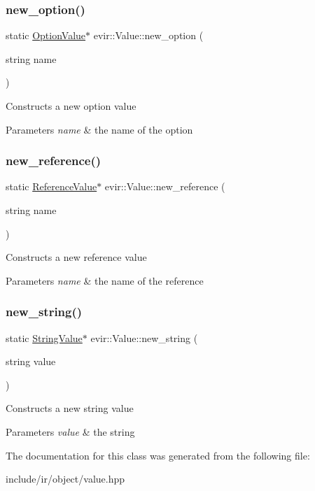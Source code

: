 \subsubsection{\texorpdfstring{new\+\_\+option()}{new\_option()}}
{\footnotesize\ttfamily static \hyperlink{classevir_1_1OptionValue}{Option\+Value}$\ast$ evir\+::\+Value\+::new\+\_\+option (\begin{DoxyParamCaption}\item[{string}]{name }\end{DoxyParamCaption})\hspace{0.3cm}{\ttfamily [static]}}

Constructs a new option value 
\begin{DoxyParams}{Parameters}
{\em name} & the name of the option \\
\hline
\end{DoxyParams}
\mbox{\label{classevir_1_1Value_a550b2d56a46a357282ad167821fedbe5}} 
\subsubsection{\texorpdfstring{new\+\_\+reference()}{new\_reference()}}
{\footnotesize\ttfamily static \hyperlink{classevir_1_1ReferenceValue}{Reference\+Value}$\ast$ evir\+::\+Value\+::new\+\_\+reference (\begin{DoxyParamCaption}\item[{string}]{name }\end{DoxyParamCaption})\hspace{0.3cm}{\ttfamily [static]}}

Constructs a new reference value 
\begin{DoxyParams}{Parameters}
{\em name} & the name of the reference \\
\hline
\end{DoxyParams}
\mbox{\label{classevir_1_1Value_a56a75d435ff168c8d3f104018f9b58a5}} 
\subsubsection{\texorpdfstring{new\+\_\+string()}{new\_string()}}
{\footnotesize\ttfamily static \hyperlink{classevir_1_1StringValue}{String\+Value}$\ast$ evir\+::\+Value\+::new\+\_\+string (\begin{DoxyParamCaption}\item[{string}]{value }\end{DoxyParamCaption})\hspace{0.3cm}{\ttfamily [static]}}

Constructs a new string value 
\begin{DoxyParams}{Parameters}
{\em value} & the string \\
\hline
\end{DoxyParams}


The documentation for this class was generated from the following file\+:\begin{DoxyCompactItemize}
\item 
include/ir/object/value.\+hpp\end{DoxyCompactItemize}
